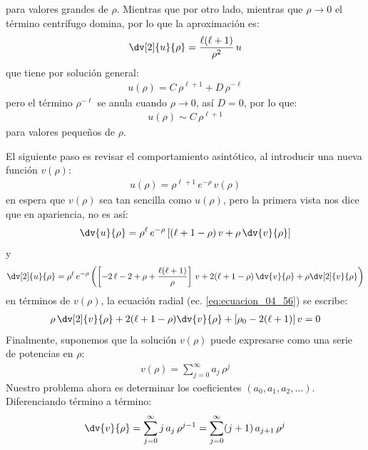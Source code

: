 para valores grandes de $\rho$. Mientras que por otro lado, mientras que $\rho \to 0$ el término centrífugo domina, por lo que la aproximación es:
\begin{align*}
\dv[2]{u}{\rho} = \dfrac{\ell (\ell + 1)}{\rho^{2}} \, u
\end{align*}
que tiene por solución general:
\begin{align*}
u(\rho) = C \, \rho^{\ell +1} + D \, \rho^{-\ell}
\end{align*}
pero el término $\rho^{-\ell}$ se anula cuando $\rho \to 0$, así $D = 0$, por lo que:
\begin{align}
u(\rho) \sim C \, \rho^{\ell + 1}
\label{eq:ecuacion_04_59}
\end{align}
para valores pequeños de $\rho$.
\par
El siguiente paso es revisar el comportamiento asintótico, al introducir una nueva función $v(\rho)$:
\begin{align}
u(\rho) = \rho^{\ell + 1} \, e^{-\rho} \, v(\rho)
\label{eq:ecuacion_04_60} 
\end{align}
en espera que $v(\rho)$ sea tan sencilla como $u(\rho)$, pero la primera vista nos dice que en apariencia, no es así:
\begin{align*}
\dv{u}{\rho} = \rho^{\ell} \, e^{-\rho} \left[ (\ell + 1 - \rho) \, v + \rho \, \dv{v}{\rho} \right]
\end{align*}
y
\begin{align*}
\dv[2]{u}{\rho} = \rho^{\ell} \, e^{-\rho} \left( \left[ -2 \, \ell - 2 + \rho + \dfrac{ \ell (\ell + 1)}{\rho} \right] \, v + 2 (\ell + 1 - \rho) \, \dv{v}{\rho} + \rho \dv[2]{v}{\rho} \right)
\end{align*}
en términos de $v(\rho)$, la ecuación radial (ec. \ref{eq:ecuacion_04_56}) se escribe:
\begin{align}
\rho \, \dv[2]{v}{\rho} + 2 (\ell + 1 - \rho) \dv{v}{\rho} + [\rho_{0} - 2 (\ell + 1)] \, v = 0
\label{eq:ecuacion_04_61}
\end{align}
Finalmente, suponemos que la solución $v(\rho)$ puede expresarse como una serie de potencias en $\rho$:
\begin{align}
v(\rho) = \sum_{j=0}^{\infty} a_{j} \, \rho^{j} 
\label{eq:ecuacion_04_62}
\end{align}
Nuestro problema ahora es determinar los coeficientes $(a_{0}, a_{1}, a_{2}, \ldots)$. Diferenciando término a término:
\begin{align*}
\dv{v}{\rho} = \sum_{j=0}^{\infty} j \, a_{j} \, \rho^{j - 1} = \sum_{j=0}^{\infty} (j + 1) \, a_{j+1} \, \rho^{j}
\end{align*}
